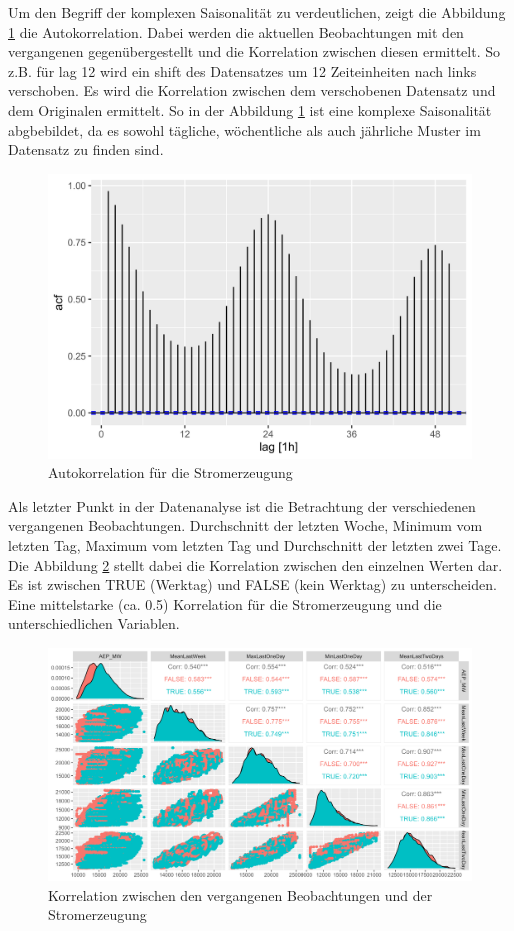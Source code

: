 \documentclass[11pt,ngerman,a4paper,]{article}
\begin{document}
Um den Begriff der komplexen Saisonalität zu verdeutlichen, zeigt die Abbildung \ref{fig:acf} die Autokorrelation. Dabei werden die aktuellen Beobachtungen mit den vergangenen gegenübergestellt und die Korrelation zwischen diesen ermittelt. So z.B. für lag 12 wird ein shift des Datensatzes um 12 Zeiteinheiten nach links verschoben. Es wird die Korrelation zwischen dem verschobenen Datensatz und dem Originalen ermittelt. So in der Abbildung \ref{fig:acf} ist eine komplexe Saisonalität abgbebildet, da es sowohl tägliche, wöchentliche als auch jährliche Muster im Datensatz zu finden sind.

\begin{figure}[H]
\centering
\includegraphics[width=1.0\textwidth]{plots/autocorrelation}
\caption{Autokorrelation für die Stromerzeugung}
\label{fig:acf}
\end{figure}

Als letzter Punkt in der Datenanalyse ist die Betrachtung der verschiedenen vergangenen Beobachtungen. Durchschnitt der letzten Woche, Minimum vom letzten Tag, Maximum vom letzten Tag und Durchschnitt der letzten zwei Tage. Die Abbildung \ref{fig:corr} stellt dabei die Korrelation zwischen den einzelnen Werten dar. Es ist zwischen TRUE (Werktag) und FALSE (kein Werktag) zu unterscheiden. Eine mittelstarke (ca. 0.5) Korrelation für die Stromerzeugung und die unterschiedlichen Variablen.

\begin{figure}[H]
\centering
\includegraphics[width=1.0\textwidth]{plots/corr.png}
\caption{Korrelation zwischen den vergangenen Beobachtungen und der Stromerzeugung}
\label{fig:corr}
\end{figure}
\end{document}

